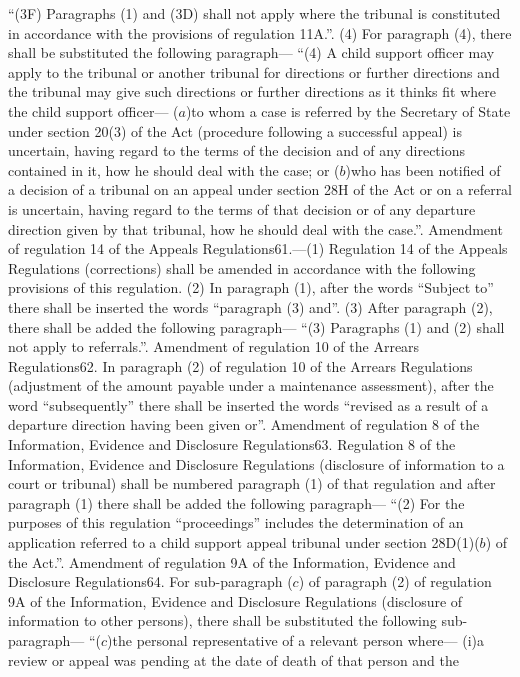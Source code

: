 \documentclass[a4paper]{article}
\begin{document}
“(3F) Paragraphs (1) and (3D) shall not apply where the tribunal is constituted
in accordance with the provisions of regulation 11A.”.
(4) For paragraph (4), there shall be substituted the following paragraph—
“(4) A child support officer may apply to the tribunal or another tribunal for
directions or further directions and the tribunal may give such directions or
further directions as it thinks fit where the child support officer—
($a$)to whom a case is referred by the Secretary of State under section 20(3) of
the Act (procedure following a successful appeal) is uncertain, having regard to
the terms of the decision and of any directions contained in it, how he should
deal with the case; or
($b$)who has been notified of a decision of a tribunal on an appeal under section
28H of the Act or on a referral is uncertain, having regard to the terms of that
decision or of any departure direction given by that tribunal, how he should
deal with the case.”.
Amendment of regulation 14 of the Appeals Regulations61.—(1) Regulation 14 of
the Appeals Regulations (corrections) shall be amended in accordance with the
following provisions of this regulation.
(2) In paragraph (1), after the words “Subject to” there shall be inserted the
words “paragraph (3) and”.
(3) After paragraph (2), there shall be added the following paragraph—
“(3) Paragraphs (1) and (2) shall not apply to referrals.”.
Amendment of regulation 10 of the Arrears Regulations62. In paragraph (2) of
regulation 10 of the Arrears Regulations (adjustment of the amount payable under
a maintenance assessment), after the word “subsequently” there shall be inserted
the words “revised as a result of a departure direction having been given or”.
Amendment of regulation 8 of the Information, Evidence and Disclosure
Regulations63. Regulation 8 of the Information, Evidence and Disclosure
Regulations (disclosure of information to a court or tribunal) shall be numbered
paragraph (1) of that regulation and after paragraph (1) there shall be added
the following paragraph—
“(2) For the purposes of this regulation “proceedings” includes the
determination of an application referred to a child support appeal tribunal
under section 28D(1)($b$) of the Act.”.
Amendment of regulation 9A of the Information, Evidence and Disclosure
Regulations64. For sub-paragraph ($c$) of paragraph (2) of regulation 9A of the
Information, Evidence and Disclosure Regulations (disclosure of information to
other persons), there shall be substituted the following sub-paragraph—
“($c$)the personal representative of a relevant person where—
(i)a review or appeal was pending at the date of death of that person and the
\end{document}
